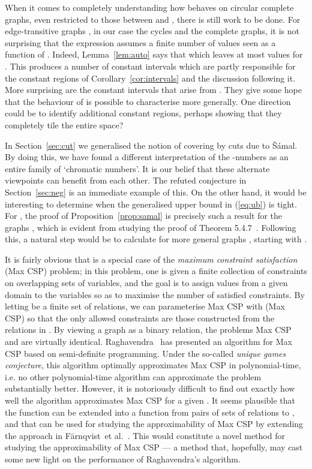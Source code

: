 \documentclass[11pt,a4paper]{article}
\begin{document}
When it comes to completely understanding how  behaves on circular complete graphs, even
restricted to those between  and , there is still work to be done.
For edge-transitive graphs , in our case the cycles and the complete graphs, 
it is not surprising
that the expression  assumes a finite number of values seen as a function of .
Indeed, Lemma~\ref{lem:auto} says that  which
leaves at most  values for .
This produces a number of constant intervals which are partly 
responsible for the constant regions of Corollary~\ref{cor:intervals} and the discussion
following it.
More surprising are the constant intervals that arise from
.
They give some hope that the behaviour of  is possible to characterise more generally.
One direction could be to identify additional constant regions,
perhaps showing that they completely tile the entire space?




In Section~\ref{sec:cut} we generalised the notion of covering by cuts
due to \v{S}\'{a}mal.
By doing this, we have found a different interpretation of the -numbers
as an entire family of `chromatic numbers'.
It is our belief that these alternate viewpoints can benefit from each other.
The refuted conjecture in Section~\ref{sec:neg} is an immediate example of
this.
On the other hand, it would be interesting to determine
when the generalised upper bound in (\ref{eq:ub}) is tight.
For , the proof of Proposition~\ref{prop:samal} is precisely such a result
for the graphs ,
which is evident from studying the proof of Theorem 5.4.7~\cite{samal:06}.
Following this, a natural step would be to calculate  for
more general graphs , starting with .



It is fairly obvious that  is a special case of the 
{\em maximum constraint satisfaction} ({\sc Max CSP}) problem;
in this problem, one is given a finite collection of constraints on overlapping
sets of variables, and the goal is to assign values from a given domain to the
variables so as to maximise the number of satisfied constraints.
By letting  be a finite set of relations, we can
parameterise {\sc Max CSP} with  ({\sc Max CSP}) so that
the only allowed constraints are those constructed from the relations in .
By viewing a graph  as a binary relation, the problems {\sc Max CSP}
and  are virtually identical. 
Raghavendra~\cite{raghavendra:08} has presented
an algorithm for {\sc Max CSP} based on semi-definite programming.
Under the so-called {\em unique games conjecture}, this algorithm
optimally approximates {\sc Max CSP} in polynomial-time, i.e. no
other polynomial-time algorithm can approximate the problem substantially better.
However, it is notoriously difficult to find out exactly how well the
algorithm approximates {\sc Max CSP} for a given .
It seems plausible that
the function  can be extended into a function  from pairs of sets
of relations to , and that  can be used for studying
the approximability of {\sc Max CSP} by extending the approach in
F\"arnqvist~et al.~\cite{farnqvist:etal:09}. This would constitute a novel method for
studying the approximability of {\sc Max CSP} --- a method that, hopefully, may
cast some new light on the performance of Raghavendra's algorithm.
\end{document}
